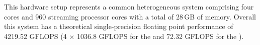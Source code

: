 This hardware setup represents a common heterogeneous system comprising four \CPU cores and 960 \GPU streaming processor cores with a total of 28\,GB of memory.
Overall this system has a theoretical single-precision floating point performance of 4219.52 GFLOPS (4 $\times$ 1036.8 GFLOPS for the \GPUs and 72.32 GFLOPS for the \CPU).

